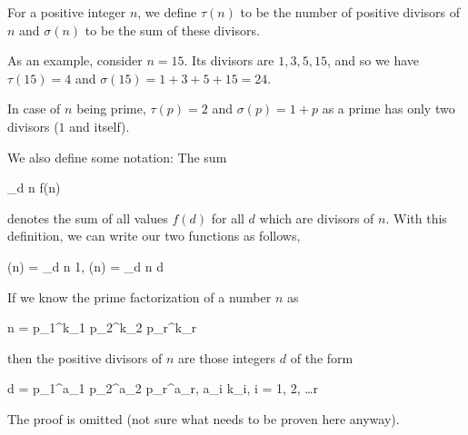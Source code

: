 
For a positive integer $n$, we define $\tau(n)$ to be the number of positive divisors of $n$ and $\sigma(n)$ to be the sum of these divisors.

As an example, consider $n = 15$. Its divisors are $1, 3, 5, 15$, and so we have $\tau(15) = 4$ and $\sigma(15) = 1 + 3 + 5 + 15 = 24$.

In case of $n$ being prime, $\tau(p) = 2$ and $\sigma(p) = 1+p$ as a prime has only two divisors ($1$ and itself).

We also define some notation: The sum

\bee
\sum_{d \mid n} f(n)
\eee

denotes the sum of all values $f(d)$ for all $d$ which are divisors of $n$. With this definition, we can write our two functions as follows,

\bee
\tau(n) = \sum_{d \mid n} 1, \qquad \sigma(n) = \sum_{d \mid n} d
\eee

If we know the prime factorization of a number $n$ as

\bee
n = p_1^{k_1} p_2^{k_2} \cdots p_r^{k_r}
\eee

then the positive divisors of $n$ are those integers $d$ of the form

\bee
d = p_1^{a_1} p_2^{a_2} \cdots p_r^{a_r},  \leq a_i \leq k_i, \quad i = 1, 2, \ldots r
\eee

The proof is omitted (not sure what needs to be proven here anyway).


